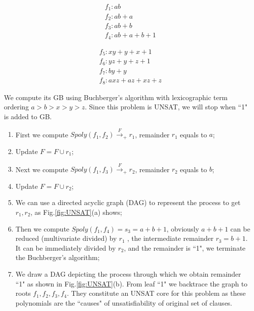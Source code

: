 \begin{Example}
\begin{minipage}[h]{0.4\textwidth}
\begin{align*}
&f_1:ab\\
&f_2:ab+a\\
&f_3:ab+b\\
&f_4:ab+a+b+1
\end{align*}
\end{minipage}
\begin{minipage}[h]{0.6\textwidth}
\begin{align*}
&f_5:xy+y+x+1\\
&f_6:yz+y+z+1\\
&f_7:by+y\\
&f_8:axz+az+xz+z
\end{align*}
\end{minipage}
We compute its GB using Buchberger's algorithm with lexicographic term ordering $a>b>x>y>z$.
Since this problem is UNSAT, we will stop when ``1" is added to GB.
\begin{enumerate}
\item First we compute $Spoly(f_1,f_2)\xrightarrow{F}_{+} r_1$, remainder $r_1$ equals to $a$;
\item Update $F=F\cup r_1$;
\item Next we compute $Spoly(f_1,f_3)\xrightarrow{F}_{+} r_2$, remainder $r_2$ equals to $b$;
\item Update $F=F\cup r_2$;
\item We can use a directed acyclic graph (DAG) to represent the process to get $r_1,r_2$, as Fig.\ref{fig:UNSAT}(a) shows;
\item Then we compute $Spoly(f_1,f_4) = s_3= a+b+1$, obviously $a+b+1$ can be reduced (multivariate divided) by
$r_1$ , the intermediate remainder $r_3 = b+1$. It can be immediately divided by $r_2$, and the remainder is ``1", we
terminate the Buchberger's algorithm;
\item We draw a DAG depicting the process through which we obtain remainder ``1" as shown in Fig.\ref{fig:UNSAT}(b). 
From leaf ``1" we backtrace the graph to roots $f_1,f_2,f_3,f_4$. They constitute an UNSAT core for this problem
as these polynomials are the ``causes" of unsatisfiability of original set of clauses.
\end{enumerate}
\end{Example}
